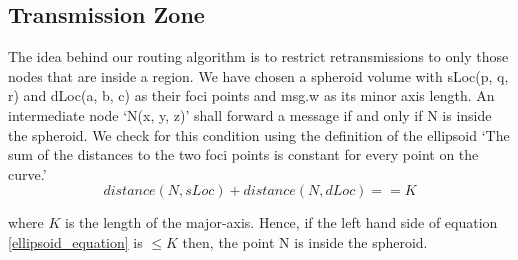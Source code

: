 \subsection{Transmission Zone}

The idea behind our routing algorithm is to restrict retransmissions to only those nodes that are inside a region. We have chosen a spheroid volume with sLoc(p, q, r) and dLoc(a, b, c) as their foci points and msg.w as its minor axis length. An intermediate node `N(x, y, z)' shall forward a message if and only if N is inside the spheroid. We check for this condition using the definition of the ellipsoid `The sum of the distances to the two foci points is constant for every point on the curve.'
\begin{equation} \label{ellipsoid_equation}
    distance(N, sLoc) + distance(N, dLoc) == K
\end{equation}

where $K$ is the length of the major-axis. Hence, if the left hand side of equation \ref{ellipsoid_equation} is $\leq K$ then, the point N is inside the spheroid.

